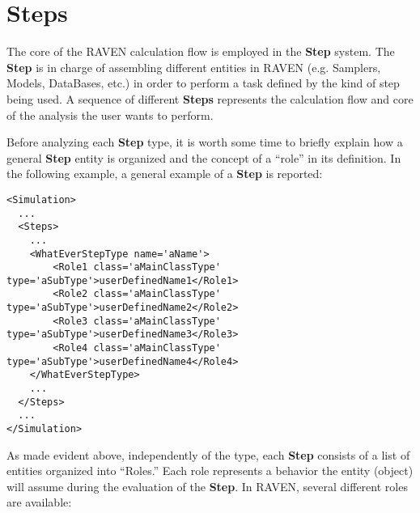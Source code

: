 \section{Steps  \\ \vspace{2 mm} {\small }}
\label{sec:steps}
The core of the RAVEN calculation flow is employed in the \textbf{Step} system.
%
The \textbf{Step} is in charge of assembling different entities in RAVEN (e.g.
Samplers, Models, DataBases, etc.) in order to perform a task defined by the
kind of step being used.
%
A sequence of different \textbf{Steps} represents the calculation flow and core
of the analysis the user wants to perform. 
%

Before analyzing each \textbf{Step} type, it is worth some time to briefly
explain how a general \textbf{Step} entity is organized and the concept of a
``role'' in its definition.
%
In the following example, a general example of a \textbf{Step} is reported:
\begin{lstlisting}[style=XML,morekeywords={class}]
<Simulation>
  ...
  <Steps>
    ...
    <WhatEverStepType name='aName'>
        <Role1 class='aMainClassType' type='aSubType'>userDefinedName1</Role1>
        <Role2 class='aMainClassType' type='aSubType'>userDefinedName2</Role2>
        <Role3 class='aMainClassType' type='aSubType'>userDefinedName3</Role3>
        <Role4 class='aMainClassType' type='aSubType'>userDefinedName4</Role4>
    </WhatEverStepType>
    ...
  </Steps>
  ...
</Simulation>
\end{lstlisting}
As made evident above, independently of the type, each \textbf{Step} consists of
a list of entities organized into ``Roles.'' 
%
Each role represents a behavior the entity (object) will assume during the
evaluation of the \textbf{Step}.
%
In RAVEN, several different roles are available:
